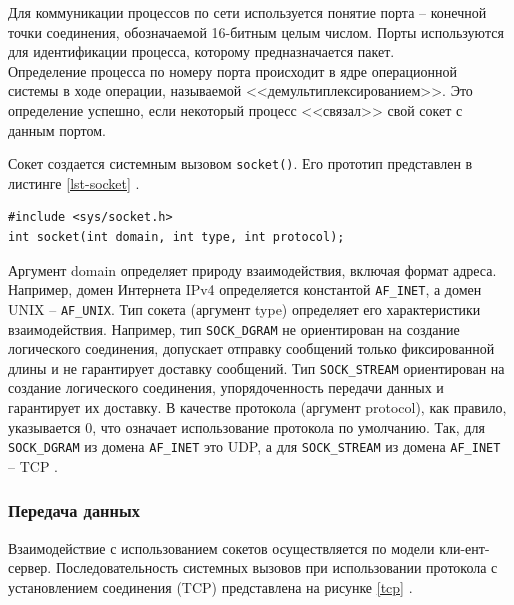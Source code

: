 Для коммуникации процессов по сети используется понятие порта -- конечной точки соединения, обозначаемой 16-битным целым числом. Порты используются для идентификации процесса, которому предназначается пакет. \\Определение процесса по номеру порта происходит в ядре операционной системы в ходе операции, называемой <<демультиплексированием>>. Это определение успешно, если некоторый процесс <<связал>> свой сокет с данным портом.

Сокет создается системным вызовом \texttt{socket()}. Его прототип представлен в листинге \ref{lst-socket} \cite{man-socket}.

\captionsetup{singlelinecheck = false, justification=raggedright}
\begin{lstlisting}[caption={Прототип системного вызова socket()}, label=lst-socket]
#include <sys/socket.h>
int socket(int domain, int type, int protocol);
\end{lstlisting}
\captionsetup{singlelinecheck = false, justification=centering}

Аргумент domain определяет природу взаимодействия, включая формат адреса. Например, домен Интернета IPv4 определяется константой \texttt{AF\_INET}, а домен UNIX -- \texttt{AF\_UNIX}. Тип сокета (аргумент type) определяет его характеристики взаимодействия. Например, тип \texttt{SOCK\_DGRAM} не ориентирован на создание логического соединения, допускает отправку сообщений только фиксированной длины и не гарантирует доставку сообщений. Тип \texttt{SOCK\_STREAM} ориентирован на создание логического соединения, упорядоченность передачи данных и гарантирует их доставку. В качестве протокола (аргумент protocol), как правило, указывается 0, что означает использование протокола по умолчанию. Так, для \texttt{SOCK\_DGRAM} из домена \texttt{AF\_INET} это UDP, а для \texttt{SOCK\_STREAM} из домена \texttt{AF\_INET} -- TCP \cite{man-socket}.

\subsubsection{Передача данных}

Взаимодействие с использованием сокетов осуществляется по модели кли-ент-сервер. Последовательность системных вызовов при использовании протокола с установлением соединения (TCP) представлена на рисунке \ref{tcp} \cite{Tiwari2012ASP}.

